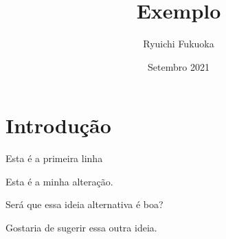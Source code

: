 \documentclass{article}
\title{Exemplo}
\author{Ryuichi Fukuoka}
\date{Setembro 2021}
\begin{document}
\maketitle

\section{Introdução}

\indent

Esta é a primeira linha

Esta é a minha alteração.

Será que essa ideia alternativa é boa?

Gostaria de sugerir essa outra ideia.
\end{document}
